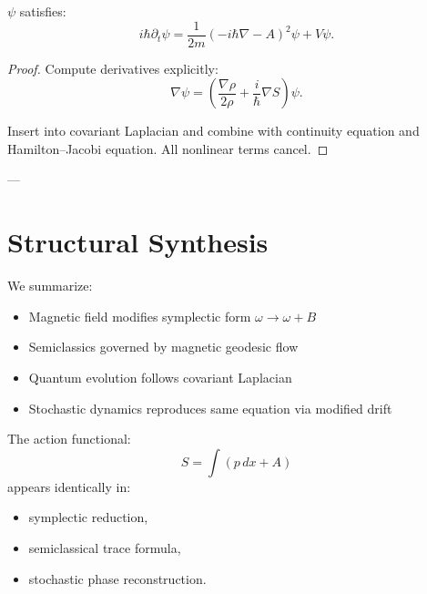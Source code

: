 \begin{theorem}
$\psi$ satisfies:
\[
i\hbar \partial_t \psi
=
\frac{1}{2m}(-i\hbar\nabla - A)^2 \psi + V\psi.
\]
\end{theorem}

\begin{proof}
Compute derivatives explicitly:
\[
\nabla \psi = \left( \frac{\nabla \rho}{2\rho} + \frac{i}{\hbar}\nabla S \right)\psi.
\]

Insert into covariant Laplacian and combine with continuity equation and Hamilton--Jacobi equation. All nonlinear terms cancel.
\end{proof}

---

\section{Structural Synthesis}

We summarize:

\begin{itemize}
\item Magnetic field modifies symplectic form $\omega \to \omega + B$
\item Semiclassics governed by magnetic geodesic flow
\item Quantum evolution follows covariant Laplacian
\item Stochastic dynamics reproduces same equation via modified drift
\end{itemize}

\begin{remark}
The action functional:
\[
S = \int (p\,dx + A)
\]
appears identically in:
\begin{itemize}
\item symplectic reduction,
\item semiclassical trace formula,
\item stochastic phase reconstruction.
\end{itemize}
\end{remark}
